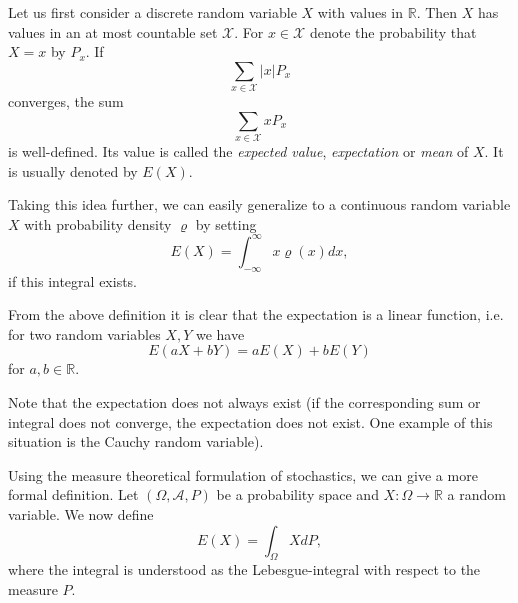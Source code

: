 \documentclass{article}
\begin{document}
Let us first consider a discrete random variable $X$ with values in $\mathbb{R}$. Then $X$ has values in an at most countable set $\mathcal{X}$. For $x\in\mathcal{X}$ denote the probability that $X=x$ by $P_x$. If
$$\sum_{x\in\mathcal{X}}|x|P_x$$
converges, the sum
$$\sum_{x\in\mathcal{X}}xP_x$$
is well-defined. Its value is called the \emph{expected value}, \emph{expectation} or \emph{mean} of $X$. It is usually denoted by $E(X)$.

Taking this idea further, we can easily generalize to a continuous random variable $X$ with probability density $\varrho$ by setting
$$E(X)=\int_{-\infty}^\infty x\varrho(x)dx,$$
if this integral exists.

From the above definition it is clear that the expectation is a linear function, i.e. for two random variables $X, Y$ we have
$$E(aX+bY)=aE(X)+bE(Y)$$
for $a,b\in\mathbb{R}$. 

Note that the expectation does not always exist (if the corresponding sum or integral does not converge, the expectation does not exist. One example of this situation is the Cauchy random variable).

Using the measure theoretical formulation of stochastics, we can give a more formal definition. Let $(\Omega, \mathcal{A}, P)$ be a probability space and $X:\Omega\to\mathbb{R}$ a random variable. We now define
$$E(X)=\int_{\Omega} XdP,$$
where the integral is understood as the Lebesgue-integral with respect to the measure $P$. 
\end{document}
